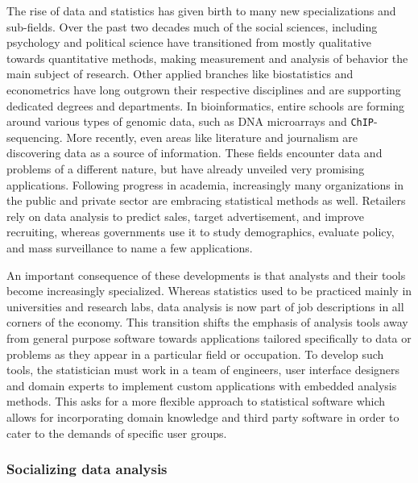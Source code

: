 The rise of data and statistics has given birth to many new specializations and sub-fields. Over the past two decades much of the social sciences, including psychology and political science have transitioned from mostly qualitative towards quantitative methods, making measurement and analysis of behavior the main subject of research. Other applied branches like biostatistics and econometrics have long outgrown their respective disciplines and are supporting dedicated degrees and departments. In bioinformatics, entire schools are forming around various types of genomic data, such as DNA microarrays and \texttt{ChIP}-sequencing. More recently, even areas like literature and journalism are discovering data as a source of information. 
These fields encounter data and problems of a different nature, but have already unveiled very promising applications. 
Following progress in academia, increasingly many organizations in the public and private sector are embracing statistical methods as well. Retailers rely on data analysis to predict sales, target advertisement, and improve recruiting, whereas governments use it to study demographics, evaluate policy, and mass surveillance to name a few applications. 

An important consequence of these developments is that analysts and their tools become increasingly specialized. Whereas statistics used to be practiced mainly in universities and research labs, data analysis is now part of job descriptions in all corners of the economy. This transition shifts the emphasis of analysis tools away from general purpose software towards applications tailored specifically to data or problems as they appear in a particular field or occupation. To develop such tools, the statistician must work in a team of engineers, user interface designers and domain experts to implement custom applications with embedded analysis methods. This asks for a more flexible approach to statistical software which allows for incorporating domain knowledge and third party software in order to cater to the demands of specific user groups. 
 


\subsubsection{Socializing data analysis}

